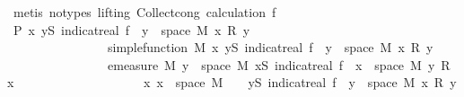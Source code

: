 \begin{isabellebody}
\ {\isacharparenleft}{\kern0pt}metis\ {\isacharparenleft}{\kern0pt}no{\isacharunderscore}{\kern0pt}types{\isacharcomma}{\kern0pt}\ lifting{\isacharparenright}{\kern0pt}\ Collect{\isacharunderscore}{\kern0pt}cong\ calculation\ f{\isacharparenleft}{\kern0pt}{}{\isacharparenright}{\kern0pt}{\isacharparenright}{\kern0pt}\isanewline
\ \ \isamarkupfalse%
\ \isamarkupfalse%
\ {\isachardoublequoteopen}P\ {\isacharparenleft}{\kern0pt}{\isasymlambda}x{\isachardot}{\kern0pt}\ {\isasymSum}y{\isasymin}S{\isachardot}{\kern0pt}\ indicat{\isacharunderscore}{\kern0pt}real\ {\isacharparenleft}{\kern0pt}f\ {\isacharminus}{\kern0pt}{\isacharbackquote}{\kern0pt}\ {\isacharbraceleft}{\kern0pt}y{\isacharbraceright}{\kern0pt}\ {\isasyminter}\ space\ M{\isacharparenright}{\kern0pt}\ x\ {\isacharasterisk}{\kern0pt}\isactrlsub R\ y{\isacharparenright}{\kern0pt}{\isachardoublequoteclose}\isanewline
\ \ \ \ \ \ \ \ \ \ \ \ \ \ \ \ {\isachardoublequoteopen}simple{\isacharunderscore}{\kern0pt}function\ M\ {\isacharparenleft}{\kern0pt}{\isasymlambda}x{\isachardot}{\kern0pt}\ {\isasymSum}y{\isasymin}S{\isachardot}{\kern0pt}\ indicat{\isacharunderscore}{\kern0pt}real\ {\isacharparenleft}{\kern0pt}f\ {\isacharminus}{\kern0pt}{\isacharbackquote}{\kern0pt}\ {\isacharbraceleft}{\kern0pt}y{\isacharbraceright}{\kern0pt}\ {\isasyminter}\ space\ M{\isacharparenright}{\kern0pt}\ x\ {\isacharasterisk}{\kern0pt}\isactrlsub R\ y{\isacharparenright}{\kern0pt}{\isachardoublequoteclose}\isanewline
\ \ \ \ \ \ \ \ \ \ \ \ \ \ \ \ {\isachardoublequoteopen}emeasure\ M\ {\isacharbraceleft}{\kern0pt}y\ {\isasymin}\ space\ M{\isachardot}{\kern0pt}\ {\isacharparenleft}{\kern0pt}{\isasymSum}x{\isasymin}S{\isachardot}{\kern0pt}\ indicat{\isacharunderscore}{\kern0pt}real\ {\isacharparenleft}{\kern0pt}f\ {\isacharminus}{\kern0pt}{\isacharbackquote}{\kern0pt}\ {\isacharbraceleft}{\kern0pt}x{\isacharbraceright}{\kern0pt}\ {\isasyminter}\ space\ M{\isacharparenright}{\kern0pt}\ y\ {\isacharasterisk}{\kern0pt}\isactrlsub R\ x{\isacharparenright}{\kern0pt}\ {\isasymnoteq}\ {}{\isacharbraceright}{\kern0pt}\ {\isasymnoteq}\ {\isasyminfinity}{\isachardoublequoteclose}\isanewline
\ \ \ \ \ \ \ \ \ \ \ \ \ \ \ \ {\isachardoublequoteopen}{\isasymAnd}x{\isachardot}{\kern0pt}\ x\ {\isasymin}\ space\ M\ {\isasymLongrightarrow}\ {}\ {\isasymle}\ {\isacharparenleft}{\kern0pt}{\isasymSum}y{\isasymin}S{\isachardot}{\kern0pt}\ indicat{\isacharunderscore}{\kern0pt}real\ {\isacharparenleft}{\kern0pt}f\ {\isacharminus}{\kern0pt}{\isacharbackquote}{\kern0pt}\ {\isacharbraceleft}{\kern0pt}y{\isacharbraceright}{\kern0pt}\ {\isasyminter}\ space\ M{\isacharparenright}{\kern0pt}\ x\ {\isacharasterisk}{\kern0pt}\isactrlsub R\ y{\isacharparenright}{\kern0pt}{\isachardoublequoteclose}\isanewline

\end{isabellebody}

